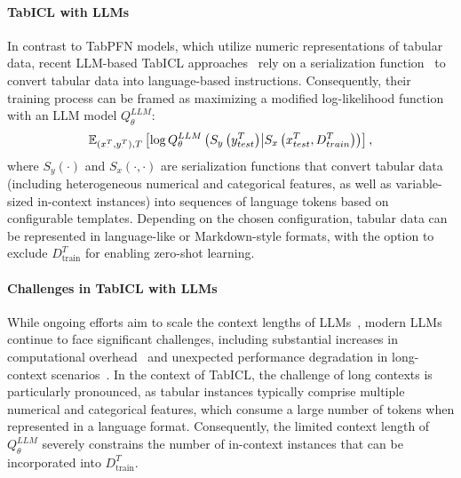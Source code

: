 \paragraph{TabICL with LLMs}
In contrast to TabPFN models, which utilize numeric representations of tabular data, recent LLM-based TabICL approaches~\citep{wen2024GTL,gardner2024TabuLa} rely on a serialization function~\citep{dinh2022LIFT,hegselmann2023TabLLM} to convert tabular data into language-based instructions. Consequently, their training process can be framed as maximizing a modified log-likelihood function with an LLM model $Q^{LLM}_{\theta}$:
\begin{align}
    \mathbb{E}_{(x^T_{\cdot}, y^T_{\cdot}), T}
    \left[ \log Q^{LLM}_\theta \left( S_{y} \left( y^T_{test} \right) \middle\vert S_{x} \left( x^T_{test}, D^T_{train} \right) \right) \right],
    \label{eq:TabICL_LLM}
\end{align}
where $S_{y}(\cdot)$ and $S_{x}(\cdot, \cdot)$ are serialization functions that convert tabular data (including heterogeneous numerical and categorical features, as well as variable-sized in-context instances) into sequences of language tokens based on configurable templates. Depending on the chosen configuration, tabular data can be represented in language-like or Markdown-style formats, with the option to exclude $D^T_{\text{train}}$ for enabling zero-shot learning.

\paragraph{Challenges in TabICL with LLMs}
While ongoing efforts aim to scale the context lengths of LLMs~\citep{xiong2023effective,abdin2024phi3}, modern LLMs continue to face significant challenges, including substantial increases in computational overhead~\citep{liu2024RingAttn} and unexpected performance degradation in long-context scenarios~\citep{li2024LongICLBench}.
In the context of TabICL, the challenge of long contexts is particularly pronounced, as tabular instances typically comprise multiple numerical and categorical features, which consume a large number of tokens when represented in a language format. Consequently, the limited context length of $Q^{LLM}_\theta$ severely constrains the number of in-context instances that can be incorporated into $D^T_{\text{train}}$.


